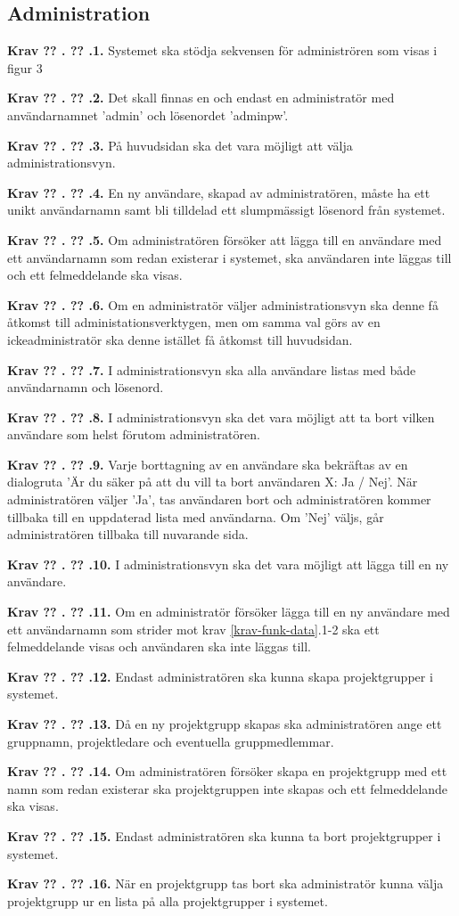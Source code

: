 \documentclass[a4paper]{article}
\newcommand\getcurrentref[1]{%
 \ifnumequal{\value{#1}}{0}
  {??}
  {\the\value{#1}}%
}
\newcommand\requirement[2]{
	\numberedrow{Krav}{#1}{#2}
}
\newcommand\numberedrow[3]{
	\noindent
	\textbf{#1 \getcurrentref{section}.\getcurrentref{subsection}.#2.} #3
	
}
\begin{document}
\subsection{Administration}
\requirement{1}{Systemet ska stödja sekvensen för administrören som visas i figur 3}
\requirement{2}{Det skall finnas en och endast en administratör med användarnamnet 'admin' och lösenordet 'adminpw'.}
\requirement{3}{På huvudsidan ska det vara möjligt att välja administrationsvyn.}
\requirement{4}{En ny användare, skapad av administratören, måste ha ett unikt användarnamn samt bli tilldelad ett slumpmässigt lösenord från systemet.}
\requirement{5}{Om administratören försöker att lägga till en användare med ett användarnamn som redan existerar i systemet, ska användaren inte läggas till och ett felmeddelande ska visas.}
\requirement{6}{Om en administratör väljer administrationsvyn ska denne få åtkomst till administationsverktygen, men om samma val görs av en ickeadministratör ska denne istället få åtkomst till huvudsidan.}
\requirement{7}{I administrationsvyn ska alla användare listas med både användarnamn och lösenord.}
\requirement{8}{I administrationsvyn ska det vara möjligt att ta bort vilken användare som helst förutom administratören.}
\requirement{9}{Varje borttagning av en användare ska bekräftas av en dialogruta 'Är du säker på att du vill ta bort användaren X: Ja / Nej'. När administratören väljer 'Ja', tas användaren bort och administratören kommer tillbaka till en uppdaterad lista med användarna. Om 'Nej' väljs, går administratören tillbaka till nuvarande sida.}
\requirement{10}{I administrationsvyn ska det vara möjligt att lägga till en ny användare.}
\requirement{11}{Om en administratör försöker lägga till en ny användare med ett användarnamn som strider mot krav \ref{krav-funk-data}.1-2 ska ett felmeddelande visas och användaren ska inte läggas till.}

\requirement{12}{Endast administratören ska kunna skapa projektgrupper i systemet.}

\requirement{13}{Då en ny projektgrupp skapas ska administratören ange ett gruppnamn, projektledare och eventuella gruppmedlemmar.}

\requirement{14}{Om administratören försöker skapa en projektgrupp med ett namn som redan existerar ska projektgruppen inte skapas och ett felmeddelande ska visas.}
\requirement{15}{Endast administratören ska kunna ta bort projektgrupper i systemet.}
\requirement{16}{När en projektgrupp tas bort ska administratör kunna välja projektgrupp ur en lista på alla projektgrupper i systemet.}
\end{document}
